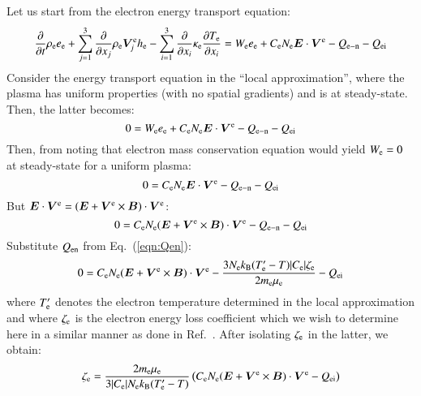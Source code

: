 \documentclass{warpdoc}
\renewcommand{\vec}[1]{\bm{#1}}
\begin{document}
Let us start from the electron energy transport equation:
%
\begin{equation}
\frac{\partial }{\partial t}\rho_{\rm e} e_{\rm e} + \sum_{j=1}^3  \frac{\partial }{\partial x_j} \rho_{\rm e} \vec{V}^{\rm e}_j h_{\rm e} 
-\sum_{i=1}^{3}\frac{\partial }{\partial x_i}\kappa_{\rm e}\frac{\partial T_{\rm e}}{\partial x_i}
= 
 W_{\rm e} e_{\rm e}
+   C_{\rm e} N_{\rm e} \vec{E} \cdot \vec{V}^{\rm e}  
- Q_{\rm e-n}
- Q_{\rm ei}
\end{equation}
%
Consider the energy transport equation in the ``local approximation'', where the plasma has uniform properties (with no spatial gradients) and is at steady-state. Then, the latter becomes:
%
\begin{equation}
0
= 
 W_{\rm e} e_{\rm e}
+   C_{\rm e} N_{\rm e} \vec{E} \cdot \vec{V}^{\rm e}  
- Q_{\rm e-n}
- Q_{\rm ei}
\end{equation}
%
Then, from noting that electron mass conservation equation would yield $W_{\rm e}=0$ at steady-state for a uniform plasma:
%
\begin{equation}
0
= 
   C_{\rm e} N_{\rm e} \vec{E} \cdot \vec{V}^{\rm e}  
- Q_{\rm e-n}
- Q_{\rm ei}
\end{equation}
%
But $\vec{E} \cdot \vec{V}^{\rm e}=(\vec{E}+\vec{V}^{\rm e}\times\vec{B}) \cdot \vec{V}^{\rm e}$:
%
\begin{equation}
0
= 
   C_{\rm e} N_{\rm e} (\vec{E}+\vec{V}^{\rm e}\times\vec{B}) \cdot \vec{V}^{\rm e}  
- Q_{\rm e-n}
- Q_{\rm ei}
\end{equation}
%
Substitute $Q_{\rm en}$ from Eq.\ (\ref{eqn:Qen}):
%
\begin{equation}
0
= 
   C_{\rm e} N_{\rm e} (\vec{E}+\vec{V}^{\rm e}\times\vec{B}) \cdot \vec{V}^{\rm e}  
- \frac{3 N_{\rm e}k_{\rm B} (T_{\rm e}^\prime-T)  |C_{\rm e}| \zeta_{\rm e}}{2 m_{\rm e}\mu_{\rm e}}
- Q_{\rm ei}
\end{equation}
%
where $T_{\rm e}^\prime$ denotes the electron temperature determined in the local approximation and where $\zeta_{\rm e}$ is the electron energy loss coefficient which we wish to determine here in a similar manner as done in Ref.\ \cite{misc:1995:boeuf}. After isolating $\zeta_{\rm e}$ in the latter, we obtain:
%
\begin{equation}
  \zeta_{\rm e}   
=  
 \frac{2 m_{\rm e} \mu_{\rm e}}{3 |C_{\rm e}| N_{\rm e} k_{\rm B} (T_{\rm e}^\prime-T) }
\left(  C_{\rm e} N_{\rm e} (\vec{E}+\vec{V}^{\rm e}\times\vec{B}) \cdot \vec{V}^{\rm e}
 - Q_{\rm ei}\right)
\label{eqn:zetae}
 \end{equation}
\end{document}
